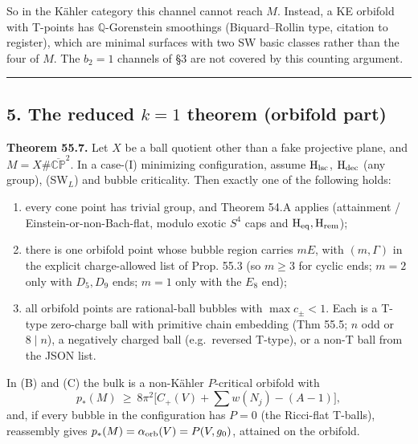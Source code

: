\documentclass[
  10pt,
]{report}
\begin{document}
So in the Kähler category this channel cannot reach \(M\). Instead, a KE
orbifold with T-points has \(\mathbb Q\)-Gorenstein smoothings
(Biquard--Rollin type, citation to register), which are minimal surfaces
with two SW basic classes rather than the four of \(M\). The \(b_2=1\)
channels of §3 are not covered by this counting argument.

\begin{center}\rule{0.5\linewidth}{0.5pt}\end{center}

\hypertarget{the-reduced-k1-theorem-orbifold-part}{%
\subsection{\texorpdfstring{5. The reduced \(k=1\) theorem (orbifold
part)}{5. The reduced k=1 theorem (orbifold part)}}\label{the-reduced-k1-theorem-orbifold-part}}

\textbf{Theorem 55.7.} Let \(X\) be a ball quotient other than a fake
projective plane, and \(M=X\#\overline{\mathbb{CP}}^2\). In a case-(I)
minimizing configuration, assume \(\mathrm H_{\rm lsc}\),
\(\mathrm H_{\rm dec}\) (any group), (SW\(_L\)) and bubble criticality.
Then exactly one of the following holds:

\begin{enumerate}
\def\labelenumi{(\Alph{enumi})}
\item
  every cone point has trivial group, and Theorem 54.A applies
  (attainment / Einstein-or-non-Bach-flat, modulo exotic \(S^4\) caps
  and \(\mathrm H_{\rm eq},\mathrm H_{\rm rem}\));
\item
  there is one orbifold point whose bubble region carries \(mE\), with
  \((m,\Gamma)\) in the explicit charge-allowed list of Prop. 55.3 (so
  \(m\ge3\) for cyclic ends; \(m=2\) only with \(D_5,D_9\) ends; \(m=1\)
  only with the \(E_8\) end);
\item
  all orbifold points are rational-ball bubbles with \(\max c_\pm<1\).
  Each is a T-type zero-charge ball with primitive chain embedding (Thm
  55.5; \(n\) odd or \(8\mid n\)), a negatively charged ball
  (e.g.~reversed T-type), or a non-T ball from the JSON list.
\end{enumerate}

In (B) and (C) the bulk is a non-Kähler \(P\)-critical orbifold with \[
p_*(M)\ \ge\ 8\pi^2\big[C_+(V)+\textstyle\sum w(N_j)-(A-1)\big],
\] and, if every bubble in the configuration has \(P=0\) (the Ricci-flat
T-balls), reassembly gives \(p_*(M)=\alpha_{\rm orb}(V)=P(V,g_0)\),
attained on the orbifold.
\end{document}
